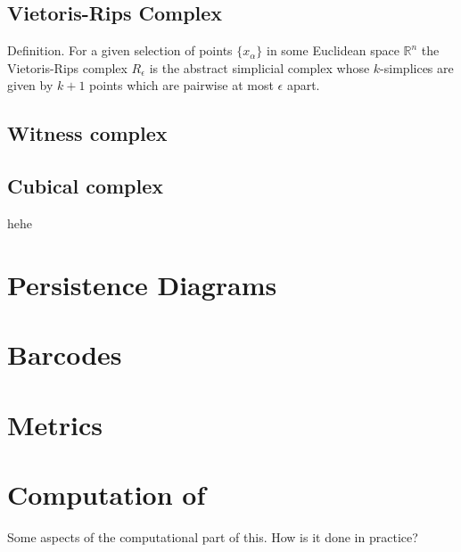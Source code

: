 \subsection{Vietoris-Rips Complex}
Definition. For a given selection of points $\{x_{\alpha}\}$ in some Euclidean space $\mathbb{R}^{n}$ the Vietoris-Rips complex $R_{\epsilon}$ is the abstract simplicial complex whose $k$-simplices are given by $k+1$ points which are pairwise at most $\epsilon$ apart.
\subsection{Witness complex}
\subsection{Cubical complex}
\begin{thm}
hehe
\end{thm}
\section{Persistence Diagrams}
\section{Barcodes}
\section{Metrics}
\section{Computation of }
Some aspects of the computational part of this. How is it done in practice?
